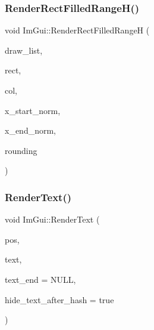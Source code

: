 \hypertarget{namespace_im_gui_af311762331bda4508b25e05f6afc7f45}{}\label{namespace_im_gui_af311762331bda4508b25e05f6afc7f45} 
\subsubsection{\texorpdfstring{Render\+Rect\+Filled\+Range\+H()}{RenderRectFilledRangeH()}}
{\footnotesize\ttfamily void Im\+Gui\+::\+Render\+Rect\+Filled\+RangeH (\begin{DoxyParamCaption}\item[{\hyperlink{struct_im_draw_list}{Im\+Draw\+List} $\ast$}]{draw\+\_\+list,  }\item[{const \hyperlink{struct_im_rect}{Im\+Rect} \&}]{rect,  }\item[{Im\+U32}]{col,  }\item[{float}]{x\+\_\+start\+\_\+norm,  }\item[{float}]{x\+\_\+end\+\_\+norm,  }\item[{float}]{rounding }\end{DoxyParamCaption})}

\hypertarget{namespace_im_gui_a9971ce57f2a288ac3a12df886c5550d1}{}\label{namespace_im_gui_a9971ce57f2a288ac3a12df886c5550d1} 
\subsubsection{\texorpdfstring{Render\+Text()}{RenderText()}}
{\footnotesize\ttfamily void Im\+Gui\+::\+Render\+Text (\begin{DoxyParamCaption}\item[{\hyperlink{struct_im_vec2}{Im\+Vec2}}]{pos,  }\item[{const char $\ast$}]{text,  }\item[{const char $\ast$}]{text\+\_\+end = {\ttfamily NULL},  }\item[{bool}]{hide\+\_\+text\+\_\+after\+\_\+hash = {\ttfamily true} }\end{DoxyParamCaption})}

\hypertarget{namespace_im_gui_ab362eafae794c7364a6b96ea06f38eb9}{}\label{namespace_im_gui_ab362eafae794c7364a6b96ea06f38eb9} 
